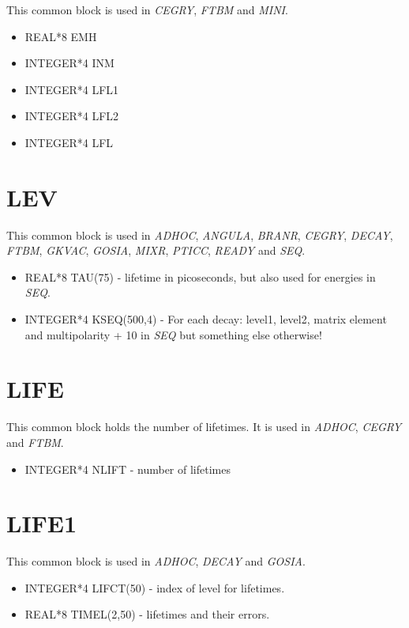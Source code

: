 This common block is used in {\em CEGRY}, {\em FTBM} and {\em MINI}.

\begin{itemize}
\item REAL*8 EMH
\item INTEGER*4 INM
\item INTEGER*4 LFL1
\item INTEGER*4 LFL2
\item INTEGER*4 LFL
\end{itemize}

\section{LEV}

This common block is used in {\em ADHOC}, {\em ANGULA}, {\em BRANR}, {\em
CEGRY}, {\em DECAY}, {\em FTBM}, {\em GKVAC}, {\em GOSIA}, {\em MIXR}, {\em
PTICC}, {\em READY} and {\em SEQ}.

\begin{itemize}
\item REAL*8 TAU(75) - lifetime in picoseconds, but also used for energies
in {\em SEQ}.
\item INTEGER*4 KSEQ(500,4) - For each decay: level1, level2, matrix element
and multipolarity + 10 in {\em SEQ} but something else otherwise!
\end{itemize}

\section{LIFE}

This common block holds the number of lifetimes. It is used in {\em ADHOC},
{\em CEGRY} and {\em FTBM}.

\begin{itemize}
\item INTEGER*4 NLIFT - number of lifetimes
\end{itemize}

\section{LIFE1}

This common block is used in {\em ADHOC}, {\em DECAY} and {\em GOSIA}.

\begin{itemize}
\item INTEGER*4 LIFCT(50) - index of level for lifetimes.
\item REAL*8 TIMEL(2,50) - lifetimes and their errors.
\end{itemize}

